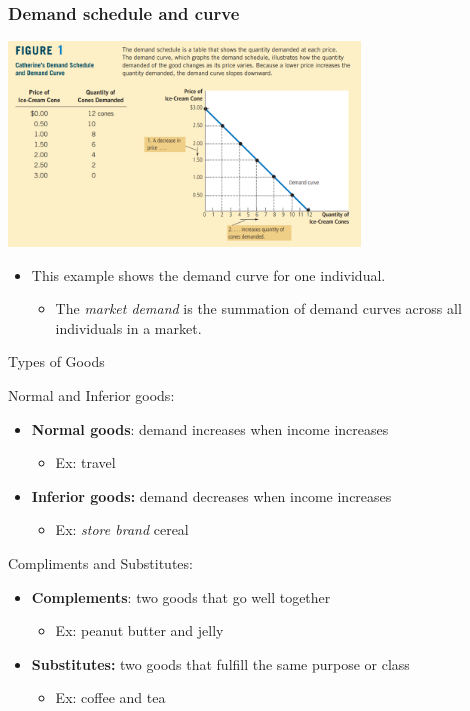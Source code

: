 \documentclass[compress]{beamer}
\begin{document}
\begin{frame}
    \frametitle{Demand schedule and curve}
    \centering
    \includegraphics[width = 0.7\textwidth,keepaspectratio]{demand_curve.png}

    \begin{itemize}
    \item This example shows the demand curve for one individual. 
    \begin{itemize}
        \item The \textit{market demand} is the summation of demand curves across all individuals in a market.
    \end{itemize}
    \end{itemize}
\end{frame}

\begin{frame}{Types of Goods}
\begin{block}{Normal and Inferior goods:}
    \begin{itemize}
        \item \textbf{Normal goods}: demand increases when income increases
        \begin{itemize}
            \item Ex: travel
        \end{itemize}
        \item \textbf{Inferior goods:} demand decreases when income increases
        \begin{itemize}
            \item Ex: \textit{store brand} cereal
        \end{itemize}
    \end{itemize}
\end{block}

\begin{block}{Compliments and Substitutes:}
    \begin{itemize}
        \item \textbf{Complements}: two goods that go well together 
        \begin{itemize}
            \item Ex: peanut butter and jelly
        \end{itemize}
        \item \textbf{Substitutes:} two goods that fulfill the same purpose or class 
        \begin{itemize}
            \item Ex: coffee and tea
        \end{itemize}
    \end{itemize}
\end{block}
\end{frame}
\end{document}
